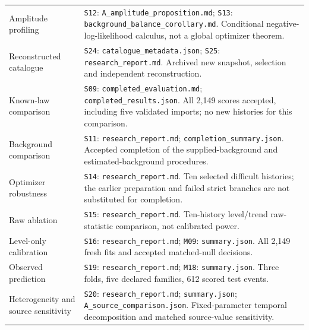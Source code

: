 \begin{longtable}{@{}>{\raggedright\arraybackslash}p{}>{\raggedright\arraybackslash}p{}@{}}
Amplitude profiling & \texttt{S12}: \nolinkurl{A_amplitude_proposition.md}; \texttt{S13}: \nolinkurl{background_balance_corollary.md}. Conditional negative-log-likelihood calculus, not a global optimizer theorem. \\
Reconstructed catalogue & \texttt{S24}: \nolinkurl{catalogue_metadata.json}; \texttt{S25}: \nolinkurl{research_report.md}. Archived new snapshot, selection and independent reconstruction. \\
Known-law comparison & \texttt{S09}: \nolinkurl{completed_evaluation.md}; \nolinkurl{completed_results.json}. All 2,149 scores accepted, including five validated imports; no new histories for this comparison. \\
Background comparison & \texttt{S11}: \nolinkurl{research_report.md}; \nolinkurl{completion_summary.json}. Accepted completion of the supplied-background and estimated-background procedures. \\
Optimizer robustness & \texttt{S14}: \nolinkurl{research_report.md}. Ten selected difficult histories; the earlier preparation and failed strict branches are not substituted for completion. \\
Raw ablation & \texttt{S15}: \nolinkurl{research_report.md}. Ten-history level/trend raw-statistic comparison, not calibrated power. \\
Level-only calibration & \texttt{S16}: \nolinkurl{research_report.md}; \texttt{M09}: \nolinkurl{summary.json}. All 2,149 fresh fits and accepted matched-null decisions. \\
Observed prediction & \texttt{S19}: \nolinkurl{research_report.md}; \texttt{M18}: \nolinkurl{summary.json}. Three folds, five declared families, 612 scored test events. \\
Heterogeneity and source sensitivity & \texttt{S20}: \nolinkurl{research_report.md}; \nolinkurl{summary.json}; \nolinkurl{A_source_comparison.json}. Fixed-parameter temporal decomposition and matched source-value sensitivity. \\
\bottomrule
\end{longtable}


